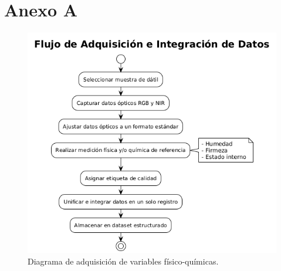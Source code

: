 
\chapter*{Anexo A}
\label{AnexoA}

\begin{figure}[th]
\centering
\includegraphics[scale=0.75]{Figures/adquisicion.png}
\decoRule
\caption{Diagrama de adquisición de variables físico-químicas.}
\label{fig:adquisicion}
\end{figure}